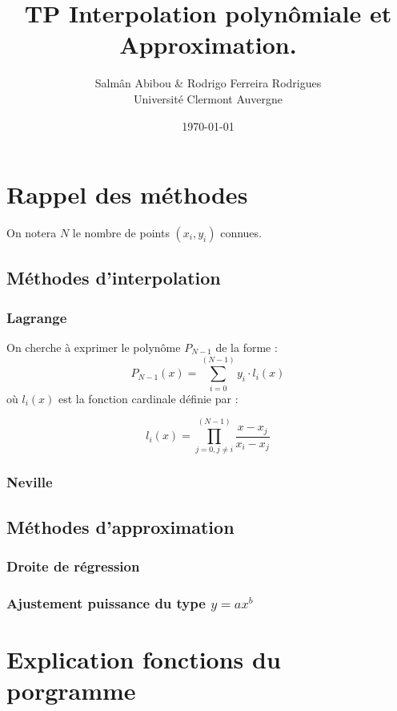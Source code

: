 \documentclass[12pt,french,titlepage]{article}
\title{TP Interpolation polynômiale et Approximation.}
\author{Salmân Abibou \& Rodrigo Ferreira Rodrigues \\
Université Clermont Auvergne\\}
\date{\today}
\begin{document}
	\maketitle


	\tableofcontents
	\newpage
	
	\section{Rappel des méthodes}
	On notera $N$ le nombre de points $(x_i,y_i)$ connues.
	\subsection{Méthodes d'interpolation}
	
	\subsubsection{Lagrange}

	On cherche à exprimer le polynôme $P_{N-1}$ de la forme :
	\begin{equation}
	P_{N-1}(x) = \sum_{i=0}^{(N-1)}y_i\cdot l_i(x)
	\end{equation}
	où $l_i(x)$ est la fonction cardinale définie par :
	
	\begin{equation}
	l_i(x) = \prod_{j=0,j\neq i}^{(N-1)}\frac{x - x_j}{x_i - x_j}
	\end{equation}
	
	\subsubsection{Neville}
	
	\subsection{Méthodes d'approximation}
	
	\subsubsection{Droite de régression}
	
	\subsubsection{Ajustement puissance du type $y = ax^b$}
	
	\section{Explication fonctions du porgramme}
	
\end{document}
